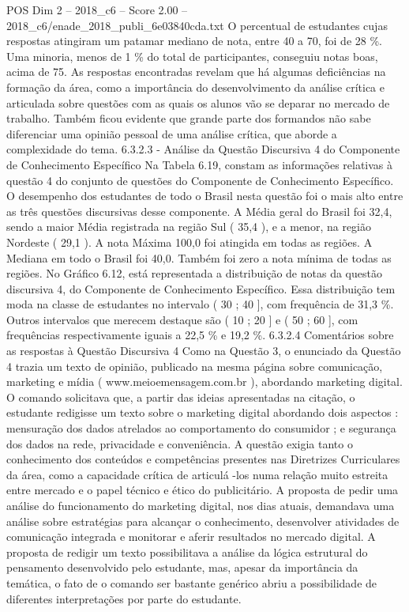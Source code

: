 \begin{textsample}{POS Dim 2 – 2018\_c6 – Score 2.00 – 2018\_c6/enade\_2018\_publi\_6e03840cda.txt}
O percentual de estudantes cujas respostas atingiram um patamar mediano de nota, entre 40 a 70, foi de 28 \%.
Uma minoria, menos de 1 \% do total de participantes, conseguiu notas boas, acima de 75.
As respostas encontradas revelam que há algumas deficiências na formação da área, como a importância do desenvolvimento da análise crítica e articulada sobre questões com as quais os alunos vão se deparar no mercado de trabalho.
Também ficou evidente que grande parte dos formandos não sabe diferenciar uma opinião pessoal de uma análise crítica, que aborde a complexidade do tema. 6.3.2.3 - Análise da Questão Discursiva 4 do Componente de Conhecimento Específico Na Tabela 6.19, constam as informações relativas à questão 4 do conjunto de questões do Componente de Conhecimento Específico.
O desempenho dos estudantes de todo o Brasil nesta questão foi o mais alto entre as três questões discursivas desse componente.
A Média geral do Brasil foi 32,4, sendo a maior Média registrada na região Sul ( 35,4 ), e a menor, na região Nordeste ( 29,1 ).
A nota Máxima 100,0 foi atingida em todas as regiões.
A Mediana em todo o Brasil foi 40,0.
Também foi zero a nota mínima de todas as regiões.
No Gráfico 6.12, está representada a distribuição de notas da questão discursiva 4, do Componente de Conhecimento Específico.
Essa distribuição tem moda na classe de estudantes no intervalo ( 30 ; 40 ], com frequência de 31,3 \%.
Outros intervalos que merecem destaque são ( 10 ; 20 ] e ( 50 ; 60 ], com frequências respectivamente iguais a 22,5 \% e 19,2 \%. 6.3.2.4 Comentários sobre as respostas à Questão Discursiva 4 Como na Questão 3, o enunciado da Questão 4 trazia um texto de opinião, publicado na mesma página sobre comunicação, marketing e mídia ( www.meioemensagem.com.br ), abordando marketing digital.
O comando solicitava que, a partir das ideias apresentadas na citação, o estudante redigisse um texto sobre o marketing digital abordando dois aspectos : mensuração dos dados atrelados ao comportamento do consumidor ; e segurança dos dados na rede, privacidade e conveniência.
A questão exigia tanto o conhecimento dos conteúdos e competências presentes nas Diretrizes Curriculares da área, como a capacidade crítica de articulá -los numa relação muito estreita entre mercado e o papel técnico e ético do publicitário.
A proposta de pedir uma análise do funcionamento do marketing digital, nos dias atuais, demandava uma análise sobre estratégias para alcançar o conhecimento, desenvolver atividades de comunicação integrada e monitorar e aferir resultados no mercado digital.
A proposta de redigir um texto possibilitava a análise da lógica estrutural do pensamento desenvolvido pelo estudante, mas, apesar da importância da temática, o fato de o comando ser bastante genérico abriu a possibilidade de diferentes interpretações por parte do estudante.

\end{textsample}
